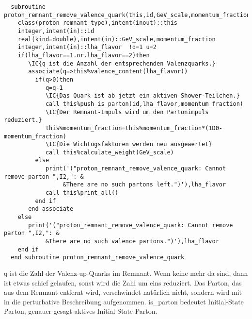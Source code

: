 \begin{Verbatim}
  subroutine proton_remnant_remove_valence_quark(this,id,GeV_scale,momentum_fraction,lha_flavor)
    class(proton_remnant_type),intent(inout)::this
    integer,intent(in)::id
    real(kind=double),intent(in)::GeV_scale,momentum_fraction
    integer,intent(in)::lha_flavor  !d=1 u=2
    if(lha_flavor==1.or.lha_flavor==2)then
       \IC{q ist die Anzahl der entsprechenden Valenzquarks.}
       associate(q=>this%valence_content(lha_flavor))
         if(q>0)then
            q=q-1
            \IC{Das Quark ist ab jetzt ein aktiven Shower-Teilchen.}
            call this%push_is_parton(id,lha_flavor,momentum_fraction)
            \IC{Der Remnant-Impuls wird um den Partonimpuls reduziert.}
            this%momentum_fraction=this%momentum_fraction*(1D0-momentum_fraction)
            \IC{Die Wichtugsfaktoren werden neu ausgewertet}
            call this%calculate_weight(GeV_scale)
         else
            print('("proton_remnant_remove_valence_quark: Cannot remove parton ",I2,": &
                 &There are no such partons left.")'),lha_flavor
            call this%print_all()
         end if
       end associate
    else
       print('("proton_remnant_remove_valence_quark: Cannot remove parton ",I2,": &
            &There are no such valence partons.")'),lha_flavor
    end if
  end subroutine proton_remnant_remove_valence_quark
\end{Verbatim}
q ist die Zahl der Valenz-up-Quarks im Remnant. Wenn keine mehr da sind, dann ist etwas schief gelaufen, sonst wird die Zahl um eins reduziert. Das Parton, das aus dem Remnant entfernt wird, verschwindet natürlich nicht, sondern wird mit  in die perturbative Beschreibung aufgenommen. is\_parton bedeutet Initial-State Parton, genauer gesagt aktives Initial-State Parton.

